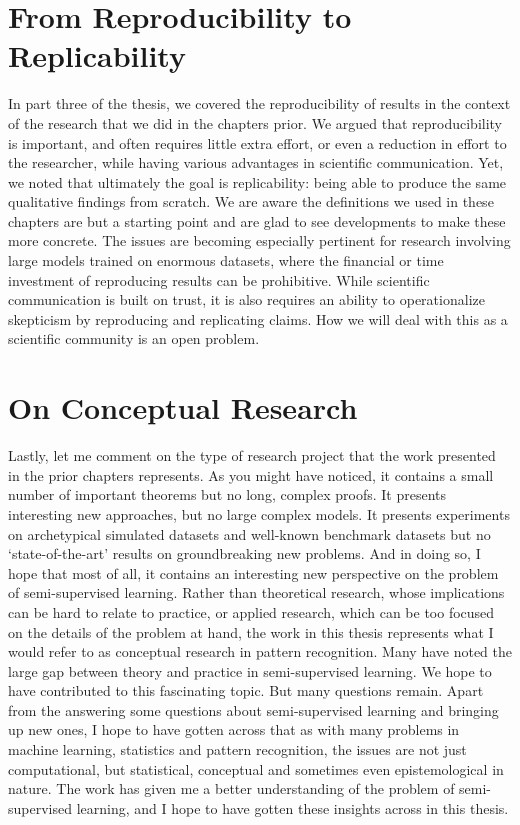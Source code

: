 \documentclass[twoside]{memoir}\usepackage[]{graphicx}\usepackage{xcolor}
\begin{document}
\section{From Reproducibility to Replicability}
In part three of the thesis, we covered the reproducibility of results in the context of the research that we did in the chapters prior. We argued that reproducibility is important, and often requires little extra effort, or even a reduction in effort to the researcher, while having various advantages in scientific communication. Yet, we noted that ultimately the goal is replicability: being able to produce the same qualitative findings from scratch. We are aware the definitions we used in these chapters are but a starting point and are glad to see developments to make these more concrete. The issues are becoming especially pertinent for research involving large models trained on enormous datasets, where the financial or time investment of reproducing results can be prohibitive. While scientific communication is built on trust, it is also requires an ability to operationalize skepticism by reproducing and replicating claims. How we will deal with this as a scientific community is an open problem.

\section{On Conceptual Research}
Lastly, let me comment on the type of research project that the work presented in the prior chapters represents. As you might have noticed, it contains a small number of important theorems but no long, complex proofs. It presents interesting new approaches, but no large complex models. It presents experiments on archetypical simulated datasets and well-known benchmark datasets but no `state-of-the-art' results on groundbreaking new problems. And in doing so, I hope that most of all, it contains an interesting new perspective on the problem of semi-supervised learning. Rather than theoretical research, whose implications can be hard to relate to practice, or applied research, which can be too focused on the details of the problem at hand, the work in this thesis represents what I would refer to as conceptual research in pattern recognition. Many have noted the large gap between theory and practice in semi-supervised learning. We hope to have contributed to this fascinating topic. But many questions remain. Apart from the answering some questions about semi-supervised learning and bringing up new ones, I hope to have gotten across that as with many problems in machine learning, statistics and pattern recognition, the issues are not just computational, but statistical, conceptual and sometimes even epistemological in nature. The work has given me a better understanding of the problem of semi-supervised learning, and I hope to have gotten these insights across in this thesis.


\scriptsize{\printbibliography[heading=bibintoc,title={References}]}

\normalsize



\end{document}
